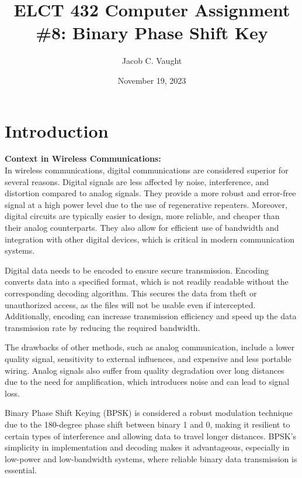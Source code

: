 \documentclass[11pt]{article}
\begin{document}
\title{ELCT 432 Computer Assignment \#8: Binary Phase Shift Key}
\author{Jacob C. Vaught}
\date{November 19, 2023}
\maketitle

\section*{Introduction}
\textbf{Context in Wireless Communications:} \\
In wireless communications, digital communications are considered superior for several reasons. Digital signals are less affected by noise, interference, and distortion compared to analog signals. They provide a more robust and error-free signal at a high power level due to the use of regenerative repeaters. Moreover, digital circuits are typically easier to design, more reliable, and cheaper than their analog counterparts. They also allow for efficient use of bandwidth and integration with other digital devices, which is critical in modern communication systems.
\newline

Digital data needs to be encoded to ensure secure transmission. Encoding converts data into a specified format, which is not readily readable without the corresponding decoding algorithm. This secures the data from theft or unauthorized access, as the files will not be usable even if intercepted. Additionally, encoding can increase transmission efficiency and speed up the data transmission rate by reducing the required bandwidth.
\newline

The drawbacks of other methods, such as analog communication, include a lower quality signal, sensitivity to external influences, and expensive and less portable wiring. Analog signals also suffer from quality degradation over long distances due to the need for amplification, which introduces noise and can lead to signal loss.
\newline

Binary Phase Shift Keying (BPSK) is considered a robust modulation technique due to the 180-degree phase shift between binary 1 and 0, making it resilient to certain types of interference and allowing data to travel longer distances. BPSK's simplicity in implementation and decoding makes it advantageous, especially in low-power and low-bandwidth systems, where reliable binary data transmission is essential.
\newline
\end{document}
